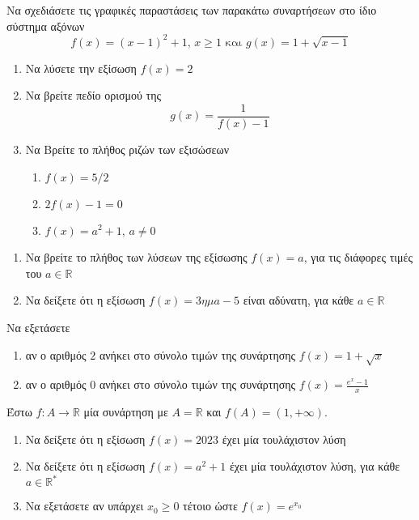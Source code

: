 \documentclass{presentation}
\begin{document}
\begin{askisi}
  Να σχεδιάσετε τις γραφικές παραστάσεις των παρακάτω συναρτήσεων στο ίδιο σύστημα αξόνων
  $$f(x)=(x-1)^2+1\text{, } x\ge 1 \text{ και } g(x)=1+\sqrt{x-1}$$
\end{askisi}

\begin{askisi}
  \href{https://www.geogebra.org/m/euy2uhma}{}
  \begin{enumerate}
    \item<1-> Να λύσετε την εξίσωση $f(x)=2$
    \item<2-> Να βρείτε πεδίο ορισμού της $$g(x)=\frac{1}{f(x)-1}$$
    \item<3-> Να Βρείτε το πλήθος ριζών των εξισώσεων
          \begin{enumerate}
            \item<4-> $f(x)=5/2$
            \item<5-> $2f(x)-1=0$
            \item<6-> $f(x)=a^2+1$, $a\ne 0$
          \end{enumerate}
  \end{enumerate}
\end{askisi}

\begin{askisi}
  \href{https://www.geogebra.org/m/dvzdm7bw}{}
  \begin{enumerate}
    \item<1-> Να βρείτε το πλήθος των λύσεων της εξίσωσης $f(x)=a$, για τις διάφορες τιμές του $a\in\mathbb{R}$
    \item<2-> Να δείξετε ότι η εξίσωση $f(x)=3ημ a - 5$ είναι αδύνατη, για κάθε $a\in\mathbb{R}$
  \end{enumerate}
\end{askisi}

\begin{askisi}
  Να εξετάσετε
  \begin{enumerate}
    \item<1-> αν ο αριθμός $2$ ανήκει στο σύνολο τιμών της συνάρτησης $f(x)=1+\sqrt{x}$
    \item<2-> αν ο αριθμός $0$ ανήκει στο σύνολο τιμών της συνάρτησης $f(x)=\frac{e^x-1}{x}$
  \end{enumerate}
\end{askisi}

\begin{askisi}
  Έστω $f:A\to\mathbb{R}$ μία συνάρτηση με $A=\mathbb{R}$ και $f(A)=(1,+\infty)$.
  \begin{enumerate}
    \item<1-> Να δείξετε ότι η εξίσωση $f(x)=2023$ έχει μία τουλάχιστον λύση
    \item<2-> Να δείξετε ότι η εξίσωση $f(x)=a^2+1$ έχει μία τουλάχιστον λύση, για κάθε $a\in\mathbb{R^*}$
    \item<3-> Να εξετάσετε αν υπάρχει $x_0\ge 0$ τέτοιο ώστε $f(x)=e^{x_0}$
  \end{enumerate}
\end{askisi}
\end{document}
